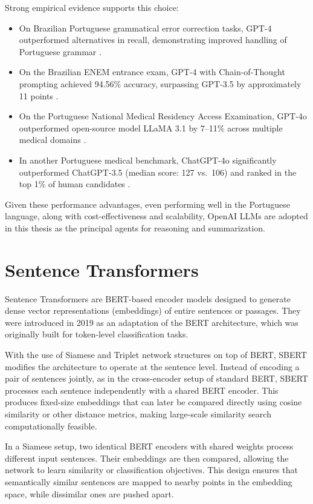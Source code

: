 Strong empirical evidence supports this choice:
\begin{itemize}
  \item On Brazilian Portuguese grammatical error correction tasks, GPT-4 outperformed alternatives in recall, demonstrating improved handling of Portuguese grammar \cite{arxiv2306.15788}.
  \item On the Brazilian ENEM entrance exam, GPT-4 with Chain-of-Thought prompting achieved 94.56\% accuracy, surpassing GPT-3.5 by approximately 11 points \cite{arxiv2303.17003}.
  \item On the Portuguese National Medical Residency Access Examination, GPT-4o outperformed open-source model LLaMA 3.1 by 7–11\% across multiple medical domains \cite{pmc12166901}.
  \item In another Portuguese medical benchmark, ChatGPT-4o significantly outperformed ChatGPT-3.5 (median score: 127 vs.\ 106) and ranked in the top 1\% of human candidates \cite{amp2025gpt4o}.
\end{itemize}

Given these performance advantages, even performing well in the Portuguese language, along with cost-effectiveness and scalability, OpenAI \ac{LLM}s are adopted in this thesis as the principal agents for reasoning and summarization.

\section{Sentence Transformers}
\label{sec:Sentence-Transformers}
Sentence Transformers are BERT-based encoder models designed to generate dense vector representations (embeddings) of entire sentences or passages. 
They were introduced in 2019 \cite{reimers2019sentencebertsentenceembeddingsusing} as an adaptation of the BERT architecture, which was originally built for token-level classification tasks.

With the use of Siamese and Triplet network structures on top of BERT, SBERT modifies the architecture to operate at the sentence level. Instead of encoding a pair of sentences jointly, as in the cross-encoder setup of standard BERT, SBERT processes each sentence independently with a shared BERT encoder. This produces fixed-size embeddings that can later be compared directly using cosine similarity or other distance metrics, making large-scale similarity search computationally feasible.

In a Siamese setup, two identical BERT encoders with shared weights process different input sentences. Their embeddings are then compared, allowing the network to learn similarity or classification objectives. This design ensures that semantically similar sentences are mapped to nearby points in the embedding space, while dissimilar ones are pushed apart.

